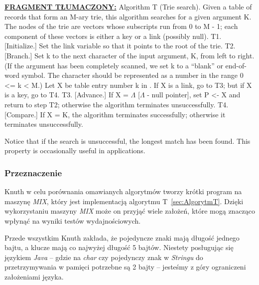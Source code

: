 	\ifsourcematerial
	\begin{displayquote}
		\color{ao(english)}
		\underline{\textbf{FRAGMENT TŁUMACZONY:}} \newline
		Algorithm T (Trie search). Given a table of records that form an M-ary trie, this
		algorithm searches for a given argument K. The nodes of the trie are vectors
		whose subscripts run from 0 to M - 1; each component of these vectors is either
		a key or a link (possibly null). \newline
		T1. [Initialize.] Set the link variable so that it points to the root of the trie. \newline
		T2. [Branch.] Set k to the next character of the input argument, K, from left
		to right. (If the argument has been completely scanned, we set k to a
		“blank” or end-of-word symbol. The character should be represented as
		a number in the range 0 <= k < M.) Let X be table entry number k in
		. If X is a link, go to T3; but if X is a key, go to T4. \newline
		T3. [Advance.] If X = $\Lambda$ [$\Lambda$ - null pointer], set P <- X and return to step T2; otherwise the
		algorithm terminates unsuccessfully. \newline
		T4. [Compare.] If X = K, the algorithm terminates successfully; otherwise it
		terminates unsuccessfully. 
		
		Notice that if the search is unsuccessful, the longest match has been found.
		This property is occasionally useful in applications.
	\end{displayquote}
	\fi
	
	\subsubsection{Przeznaczenie}\label{sec:AlgorytmTPrzeznaczenie}
	
	Knuth w celu porównania omawianych algorytmów tworzy krótki program na maszynę \emph{MIX}, który jest implementacją algorytmu T~\ref{sec:AlgorytmT}. Dzięki wykorzystaniu maszyny \emph{MIX} może on przyjąć wiele założeń, które mogą znacząco wpłynąć na wyniki testów wydajnościowych. 
	
	Przede wszystkim Knuth zakłada, że pojedyncze znaki mają długość jednego bajtu, a klucze mają co najwyżej długość 5 bajtów. Niestety posługując się językiem \emph{Java} -- gdzie na \emph{char} czy pojedynczy znak w \emph{Stringu} do przetrzymywania w pamięci potrzebne są 2 bajty -- jesteśmy z góry ograniczeni założeniami języka.
	
